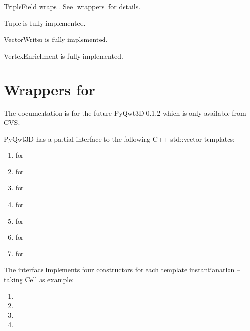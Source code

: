 \documentclass{manual}
\newcommand{\Future}{
  \begin{notice}[warning]
    The documentation is for the future PyQwt3D-0.1.2 which is only available
    from CVS.
  \end{notice}
}
\begin{document}
\begin{classdesc*}{TripleField}
wraps . See \ref{wrappers} for details.
\end{classdesc*}

\begin{classdesc*}{Tuple}
is fully implemented.
\end{classdesc*}

\begin{classdesc*}{VectorWriter}
is fully implemented.
\end{classdesc*}

\begin{classdesc*}{VertexEnrichment}
is fully implemented.
\end{classdesc*}

\section{Wrappers for  \label{wrappers}}

\Future{}

PyQwt3D has a partial interface to the following C++ std::vector templates:
\begin{enumerate}
\item
   for 
\item
   for 
\item
   for 
\item
   for 
\item
   for 
\item
   for 
\item
   for 
\end{enumerate}

The interface implements four constructors for each template instantianation --
taking Cell as example:
\begin{enumerate}
\item
\item
\item
\item
\end{enumerate}
\end{document}
